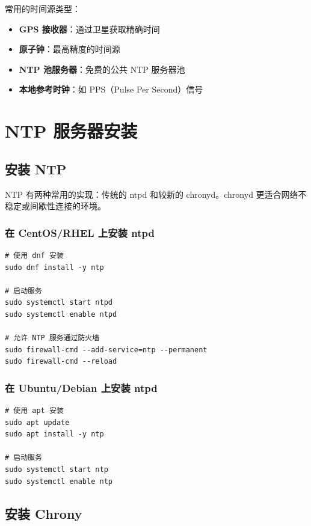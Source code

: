 \documentclass[12pt,UTF8]{ctexbook}
\begin{document}
常用的时间源类型：
\begin{itemize}
    \item \textbf{GPS 接收器}：通过卫星获取精确时间
    \item \textbf{原子钟}：最高精度的时间源
    \item \textbf{NTP 池服务器}：免费的公共 NTP 服务器池
    \item \textbf{本地参考时钟}：如 PPS（Pulse Per Second）信号
\end{itemize}

\chapter{NTP 服务器安装}
\label{chap:ntp_install}

\section{安装 NTP}
\label{sec:install_ntp}

NTP 有两种常用的实现：传统的 ntpd 和较新的 chronyd。chronyd 更适合网络不稳定或间歇性连接的环境。

\subsection{在 CentOS/RHEL 上安装 ntpd}

\begin{verbatim}
# 使用 dnf 安装
sudo dnf install -y ntp

# 启动服务
sudo systemctl start ntpd
sudo systemctl enable ntpd

# 允许 NTP 服务通过防火墙
sudo firewall-cmd --add-service=ntp --permanent
sudo firewall-cmd --reload
\end{verbatim}

\subsection{在 Ubuntu/Debian 上安装 ntpd}

\begin{verbatim}
# 使用 apt 安装
sudo apt update
sudo apt install -y ntp

# 启动服务
sudo systemctl start ntp
sudo systemctl enable ntp
\end{verbatim}

\section{安装 Chrony}
\label{sec:install_chrony}
\end{document}
